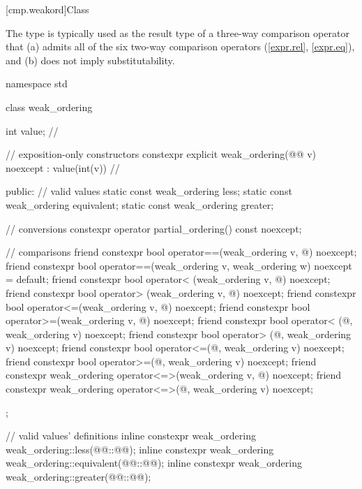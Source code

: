 [cmp.weakord]{Class }

\pnum
The  type is typically used
as the result type of a three-way comparison operator
that (a) admits all of the six two-way comparison operators (\ref{expr.rel}, \ref{expr.eq}),
and (b) does not imply substitutability.

%
%
%
%
\begin{codeblock}
namespace std {
  class weak_ordering {
    int value;  // \expos

    // exposition-only constructors
    constexpr explicit weak_ordering(@@ v) noexcept : value(int(v)) {} // \expos

  public:
    // valid values
    static const weak_ordering less;
    static const weak_ordering equivalent;
    static const weak_ordering greater;

    // conversions
    constexpr operator partial_ordering() const noexcept;

    // comparisons
    friend constexpr bool operator==(weak_ordering v, @\unspec@) noexcept;
    friend constexpr bool operator==(weak_ordering v, weak_ordering w) noexcept = default;
    friend constexpr bool operator< (weak_ordering v, @\unspec@) noexcept;
    friend constexpr bool operator> (weak_ordering v, @\unspec@) noexcept;
    friend constexpr bool operator<=(weak_ordering v, @\unspec@) noexcept;
    friend constexpr bool operator>=(weak_ordering v, @\unspec@) noexcept;
    friend constexpr bool operator< (@\unspec@, weak_ordering v) noexcept;
    friend constexpr bool operator> (@\unspec@, weak_ordering v) noexcept;
    friend constexpr bool operator<=(@\unspec@, weak_ordering v) noexcept;
    friend constexpr bool operator>=(@\unspec@, weak_ordering v) noexcept;
    friend constexpr weak_ordering operator<=>(weak_ordering v, @\unspec@) noexcept;
    friend constexpr weak_ordering operator<=>(@\unspec@, weak_ordering v) noexcept;
  };

  // valid values' definitions
  inline constexpr weak_ordering weak_ordering::less(@@::@@);
  inline constexpr weak_ordering weak_ordering::equivalent(@@::@@);
  inline constexpr weak_ordering weak_ordering::greater(@@::@@);
}
\end{codeblock}

